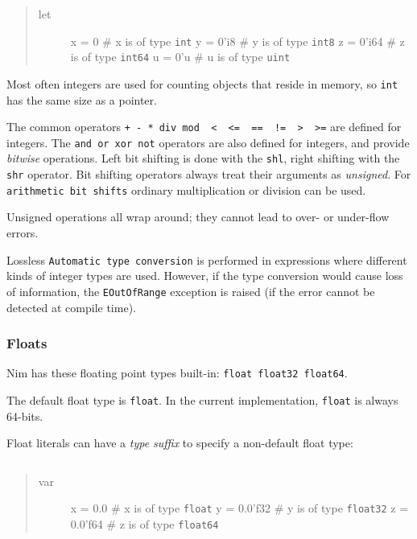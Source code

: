 \begin{quote}
\begin{description}
\item[let]
x = 0 \# x is of type \texttt{int} y = 0'i8 \# y is of type
\texttt{int8} z = 0'i64 \# z is of type \texttt{int64} u = 0'u \# u is
of type \texttt{uint}
\end{description}
\end{quote}

Most often integers are used for counting objects that reside in memory,
so \texttt{int} has the same size as a pointer.

The common operators
\texttt{+\ -\ *\ div\ mod\ \ \textless{}\ \ \textless{}=\ \ ==\ \ !=\ \ \textgreater{}\ \ \textgreater{}=}
are defined for integers. The \texttt{and\ or\ xor\ not} operators are
also defined for integers, and provide \emph{bitwise} operations. Left
bit shifting is done with the \texttt{shl}, right shifting with the
\texttt{shr} operator. Bit shifting operators always treat their
arguments as \emph{unsigned}. For \texttt{arithmetic\ bit\ shifts}
ordinary multiplication or division can be used.

Unsigned operations all wrap around; they cannot lead to over- or
under-flow errors.

Lossless \texttt{Automatic\ type\ conversion} is performed in
expressions where different kinds of integer types are used. However, if
the type conversion would cause loss of information, the
\texttt{EOutOfRange} exception is raised (if the error cannot be
detected at compile time).

\hypertarget{floats}{%
\subsubsection{Floats}\label{floats}}

Nim has these floating point types built-in:
\texttt{float\ float32\ float64}.

The default float type is \texttt{float}. In the current implementation,
\texttt{float} is always 64-bits.

Float literals can have a \emph{type suffix} to specify a non-default
float type:

\begin{verbatim}
\end{verbatim}

\begin{quote}
\begin{description}
\item[var]
x = 0.0 \# x is of type \texttt{float} y = 0.0'f32 \# y is of type
\texttt{float32} z = 0.0'f64 \# z is of type \texttt{float64}
\end{description}
\end{quote}

